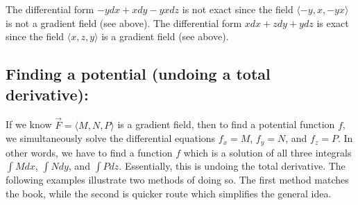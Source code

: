 \begin{example}
The differential form $-ydx+xdy-yxdz$ is not
  exact since the field $\langle-y,x,-yx\rangle$ is not a gradient
  field (see above).  The differential form $xdx+zdy+ydz$ is exact
  since the field $\langle x,z,y\rangle$ is a gradient field (see
  above).
\end{example}
\subsection{Finding a potential (undoing a total derivative):} If we know
$\vec F=\langle M,N,P\rangle$ is a gradient field, then to find a potential
function $f$, we simultaneously solve the differential equations
$f_x=M$, $f_y=N$, and $f_z=P$.  In other words, we have to find a
function $f$ which is a solution of all three integrals $\int Mdx$, $\int
Ndy$, and $\int Pdz$.  Essentially, this is undoing the total
derivative. The following examples illustrate two methods of doing so.
The first method matches the book, while the second is quicker route which
simplifies the general idea.
